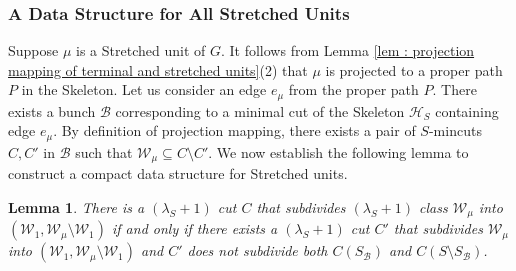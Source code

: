 \documentclass[letterpaper,11pt]{article}
\newtheorem{lemma}{Lemma}[]
\begin{document}
\subsubsection{A Data Structure for All Stretched Units} \label{sec : stretched unit data structure}
 Suppose $\mu$ is a Stretched unit of $G$. It follows from Lemma \ref{lem : projection mapping of terminal and stretched units}(2) that $\mu$ is projected to a proper path $P$ in the Skeleton. Let us consider an edge $e_{\mu}$ from the proper path $P$. There exists a bunch ${\mathcal B}$ corresponding to a minimal cut of the Skeleton ${\mathcal H}_S$ containing edge $e_{\mu}$. By definition of projection mapping, there exists a pair of $S$-mincuts $C,C'$ in ${\mathcal B}$ such that ${\mathcal W}_{\mu}\subseteq C\setminus C'$. We now establish the following lemma to construct a compact data structure for Stretched units.
\begin{lemma} \label{lem : cuts are stored}
    There is a $(\lambda_S+1)$ cut $C$ that subdivides $(\lambda_S+1)$ class ${\mathcal W}_{\mu}$ into $({\mathcal W}_1,{\mathcal W}_{\mu}\setminus {\mathcal W}_1)$ if and only if there exists a $(\lambda_S+1)$ cut $C'$ that subdivides ${\mathcal W}_{\mu}$ into $({\mathcal W}_1,{\mathcal W}_{\mu}\setminus {\mathcal W}_1)$ and $C'$ does not subdivide both $C(S_{\mathcal B})$ and $C(S\setminus S_{\mathcal B})$.
\end{lemma}
\end{document}
